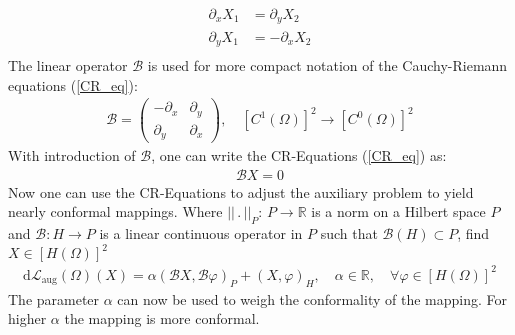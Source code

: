 \begin{equation}\label{CR_eq}
	\begin{aligned}
		\partial_x X_1 &= \partial_y X_2 \\
		\partial_y X_1 &= -\partial_x X_2 \\
	\end{aligned}
\end{equation}
The linear operator $\mathcal{B}$ is used for more compact notation of the 
Cauchy-Riemann equations (\ref{CR_eq}):
\begin{equation}\label{CR_B}
	\begin{aligned}
		\mathcal{B} = 
		\begin{pmatrix}
			-\partial_x & \partial_y\\
			\partial_y & \partial_x
		\end{pmatrix} ,\quad [C^1(\Omega)]^2 \rightarrow [C^0(\Omega)]^2
	\end{aligned}
\end{equation}
With introduction of $\mathcal{B}$, one can write the CR-Equations (\ref{CR_eq}) as:
\begin{align*}
	\mathcal{B}X=0
\end{align*}
Now one can use the CR-Equations to adjust the auxiliary problem to yield nearly conformal 
mappings. Where $|| \, . \, ||_P: \, P \rightarrow \mathbb{R}$ is a
norm on a Hilbert space $P$ and $\mathcal{B}:H \rightarrow P$ is a linear continuous operator 
in $P$  such that $\mathcal{B}(H) \subset P$, find $X \in [H(\Omega)]^2$
\begin{align}
	\mathrm{d}\mathcal{L}_{\mathrm{aug}}(\Omega)(X) = \alpha (\mathcal{B}X,\mathcal{B}\varphi)_P
	+ (X,\varphi)_H, \quad \alpha \in \mathbb{R}, \quad \forall \varphi \in [H(\Omega)]^2
\end{align}
The parameter $\alpha$ can now be used to weigh the conformality of the mapping. For higher 
$\alpha$ the mapping is more conformal.


